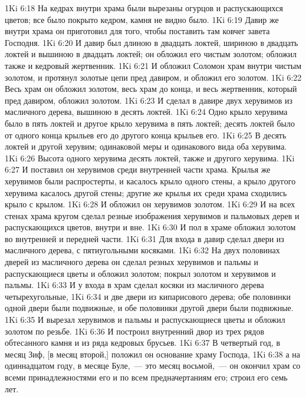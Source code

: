 \vs 1Ki 6:18 На кедрах внутри храма были вырезаны  огурцов и распускающихся цветов; все было покрыто кедром, камня не видно было.
\vs 1Ki 6:19 Давир же внутри храма он приготовил для того, чтобы поставить там ковчег завета Господня.
\vs 1Ki 6:20 И давир был длиною в двадцать локтей, шириною в двадцать локтей и вышиною в двадцать локтей; он обложил его чистым золотом; обложил также и кедровый жертвенник.
\vs 1Ki 6:21 И обложил Соломон храм внутри чистым золотом, и протянул золотые цепи пред давиром, и обложил его золотом.
\vs 1Ki 6:22 Весь храм он обложил золотом, весь храм до конца, и весь жертвенник, который пред давиром, обложил золотом.
\vs 1Ki 6:23 И сделал в давире двух херувимов из масличного дерева, вышиною в десять локтей.
\vs 1Ki 6:24 Одно крыло херувима было в пять локтей и другое крыло херувима в пять локтей; десять локтей было от одного конца крыльев его до другого конца крыльев его.
\vs 1Ki 6:25 В десять локтей  и другой херувим; одинаковой меры и одинакового вида  оба херувима.
\vs 1Ki 6:26 Высота одного херувима  десять локтей, также и другого херувима.
\vs 1Ki 6:27 И поставил он херувимов среди внутренней части храма. Крылья же херувимов были распростерты, и касалось крыло одного  стены, а крыло другого херувима касалось другой стены; другие же крылья их среди храма сходились крыло с крылом.
\vs 1Ki 6:28 И обложил он херувимов золотом.
\vs 1Ki 6:29 И на всех стенах храма кругом сделал резные изображения херувимов и пальмовых дерев и распускающихся цветов, внутри и вне.
\vs 1Ki 6:30 И пол в храме обложил золотом во внутренней и передней части.
\vs 1Ki 6:31 Для входа в давир сделал двери из масличного дерева, с пятиугольными косяками.
\vs 1Ki 6:32 На двух половинах дверей из масличного дерева он сделал резных херувимов и пальмы и распускающиеся цветы и обложил золотом; покрыл золотом и херувимов и пальмы.
\vs 1Ki 6:33 И у входа в храм сделал косяки из масличного дерева четырехугольные,
\vs 1Ki 6:34 и две двери из кипарисового дерева; обе половинки одной двери были подвижные, и обе половинки другой двери были подвижные.
\vs 1Ki 6:35 И вырезал  херувимов и пальмы и распускающиеся цветы и обложил золотом по резьбе.
\vs 1Ki 6:36 И построил внутренний двор из трех рядов обтесанного камня и из ряда кедровых брусьев.
\vs 1Ki 6:37 В четвертый год, в месяц Зиф, [в месяц второй,] положил он основание храму Господа,
\vs 1Ki 6:38 а на одиннадцатом году, в месяце Буле,~--- это месяц восьмой,~--- он окончил храм со всеми принадлежностями его и по всем предначертаниям его; строил его семь лет.
